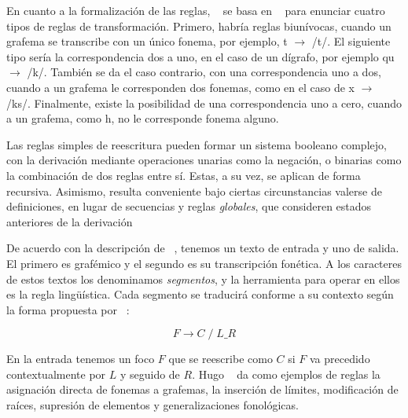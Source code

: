 En cuanto a la formalización de las reglas, \citeauthor{riosmestre1999}~\parencite*[2.4]{riosmestre1999} se basa en \citeauthor{chomsky1968}~\parencite*{chomsky1968} para enunciar cuatro tipos de reglas de transformación. Primero, habría reglas biunívocas, cuando un grafema se transcribe con un único fonema, por ejemplo, \textlangle{}t\textrangle{} $\rightarrow$ /t/. El siguiente tipo sería la correspondencia dos a uno, en el caso de un dígrafo, por ejemplo \textlangle{}qu\textrangle{} $\rightarrow$ /k/. También se da el caso contrario, con una correspondencia uno a dos, cuando a un grafema le corresponden dos fonemas, como en el caso de  \textlangle{}x\textrangle{} $\rightarrow$ /ks/. Finalmente, existe la posibilidad de una correspondencia uno a cero, cuando a un grafema, como \textlangle{}h\textrangle{}, no le corresponde fonema alguno.

Las reglas simples de reescritura pueden formar un sistema booleano complejo, con la derivación mediante operaciones unarias como la negación, o binarias como la combinación de dos reglas entre sí. Estas, a su vez, se aplican de forma recursiva. Asimismo, resulta conveniente bajo ciertas circunstancias valerse de definiciones, en lugar de secuencias y reglas \textit{globales}, que consideren estados anteriores de la derivación \parencite[2.4]{riosmestre1999}

De acuerdo con la descripción de \citeauthor{vanleuwen1989}~\parencite*{vanleuwen1989}, tenemos un texto de entrada y uno de salida. El primero es grafémico y el segundo es su transcripción fonética. A los caracteres de estos textos los denominamos \textit{segmentos}, y la herramienta para operar en ellos es la regla lingüística. Cada segmento se traducirá conforme a su contexto según la forma propuesta por \citeauthor{chomsky1968}~\parencite*{chomsky1968}:

	\[F \longrightarrow C\;/\;L\_R\]

En la entrada tenemos un foco $F$  que se reescribe como $C$ si $F$ va precedido contextualmente por $L$ y seguido de $R$. Hugo  \citeauthor{vanleuwen1989}~\parencite*[86]{vanleuwen1989} da como ejemplos de reglas la asignación directa de fonemas a grafemas, la inserción de límites, modificación de raíces, supresión de elementos y generalizaciones fonológicas.

